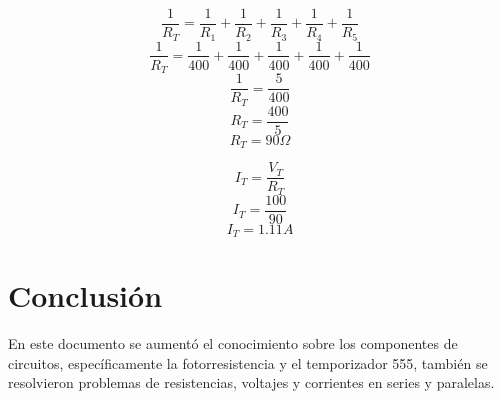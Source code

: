 \documentclass[stu, 12pt, letterpaper, donotrepeattitle, floatsintext, natbib, helv]{apa7}
\begin{document}
\[\frac{1}{R_T} = \frac{1}{R_1} + \frac{1}{R_2} + \frac{1}{R_3} + \frac{1}{R_4} + \frac{1}{R_5}\]
\[\frac{1}{R_T} = \frac{1}{400} + \frac{1}{400} + \frac{1}{400} + \frac{1}{400} + \frac{1}{400}\]
\[\frac{1}{R_T} = \frac{5}{400}\]
\[R_T = \frac{400}{5}\]
\[R_T = 90\Omega\]

\[I_T = \frac{V_T}{R_T}\]
\[I_T = \frac{100}{90}\]
\[I_T = 1.11A\]
\section{Conclusión}
En este documento se aumentó el conocimiento sobre los componentes de circuitos, específicamente la fotorresistencia y el temporizador 555, también se resolvieron problemas de resistencias, voltajes y corrientes en series y paralelas.

\newpage
\renewcommand\refname{\large\textbf{Referencias}}

\end{document}
